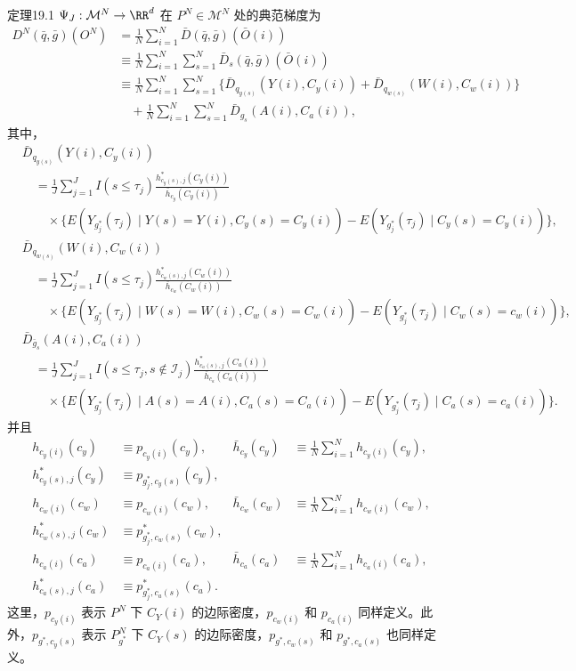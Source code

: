 \begin{bookresult}{定理}{19.1}
$\Psi_J:\mathcal M^N\to\RR^d$ 在 $P^N\in\mathcal M^N$ 处的典范梯度为
\[
\begin{aligned}
 D^N(\bar q,\bar g)(O^N)
 &=\frac1N\sum_{i=1}^N\bar D(\bar q,\bar g)(\bar O(i))\\
 &\equiv\frac1N\sum_{i=1}^N\sum_{s=1}^N\bar D_s(\bar q,\bar g)(\bar O(i))\\
 &\equiv\frac1N\sum_{i=1}^N\sum_{s=1}^N
 \{\bar D_{q_{y(s)}}(Y(i),C_y(i))+\bar D_{q_{w(s)}}(W(i),C_w(i))\}\\
 &\quad+\frac1N\sum_{i=1}^N\sum_{s=1}^N\bar D_{g_s}(A(i),C_a(i)),
\end{aligned}
\]
其中，
\[
\begin{aligned}
 &\bar D_{q_{y(s)}}(Y(i),C_y(i))\\
 &\quad=\frac1J\sum_{j=1}^J I(s\leq\tau_j)
 \frac{h^*_{c_y(s),j}(C_y(i))}{\bar h_{c_y}(C_y(i))}\\
 &\qquad\times\{E(Y_{g_j^*}(\tau_j)\mid Y(s)=Y(i),C_y(s)=C_y(i))
 -E(Y_{g_j^*}(\tau_j)\mid C_y(s)=C_y(i))\},
\end{aligned}
\]
\[
\begin{aligned}
 &\bar D_{q_{w(s)}}(W(i),C_w(i))\\
 &\quad=\frac1J\sum_{j=1}^J I(s\leq\tau_j)
 \frac{h^*_{c_w(s),j}(C_w(i))}{\bar h_{c_w}(C_w(i))}\\
 &\qquad\times\{E(Y_{g_j^*}(\tau_j)\mid W(s)=W(i),C_w(s)=C_w(i))
 -E(Y_{g_j^*}(\tau_j)\mid C_w(s)=c_w(i))\},
\end{aligned}
\]
\[
\begin{aligned}
 &\bar D_{\bar g_s}(A(i),C_a(i))\\
 &\quad=\frac1J\sum_{j=1}^J I(s\leq\tau_j,s\notin\mathcal I_j)
 \frac{h^*_{c_a(s),j}(C_a(i))}{\bar h_{c_a}(C_a(i))}\\
 &\qquad\times\{E(Y_{g_j^*}(\tau_j)\mid A(s)=A(i),C_a(s)=C_a(i))
 -E(Y_{g_j^*}(\tau_j)\mid C_a(s)=c_a(i))\}.
\end{aligned}
\]
并且
\[
\begin{aligned}
 h_{c_y(i)}(c_y)&\equiv p_{c_y(i)}(c_y),&
 \bar h_{c_y}(c_y)&\equiv\frac1N\sum_{i=1}^N h_{c_y(i)}(c_y),\\
 h^*_{c_y(s),j}(c_y)&\equiv p_{g_j^*,c_y(s)}(c_y),\\
 h_{c_w(i)}(c_w)&\equiv p_{c_w(i)}(c_w),&
 \bar h_{c_w}(c_w)&\equiv\frac1N\sum_{i=1}^N h_{c_w(i)}(c_w),\\
 h^*_{c_w(s),j}(c_w)&\equiv p^*_{g_j^*,c_w(s)}(c_w),\\
 h_{c_a(i)}(c_a)&\equiv p_{c_a(i)}(c_a),&
 \bar h_{c_a}(c_a)&\equiv\frac1N\sum_{i=1}^N h_{c_a(i)}(c_a),\\
 h^*_{c_a(s),j}(c_a)&\equiv p^*_{g_j^*,c_a(s)}(c_a).
\end{aligned}
\]
这里，$p_{c_y(i)}$ 表示 $P^N$ 下 $C_Y(i)$ 的边际密度，$p_{c_w(i)}$ 和 $p_{c_a(i)}$ 同样定义。此外，$p_{g^*,c_y(s)}$ 表示 $P^N_{g^*}$ 下 $C_Y(s)$ 的边际密度，$p_{g^*,c_w(s)}$ 和 $p_{g^*,c_a(s)}$ 也同样定义。
\end{bookresult}

